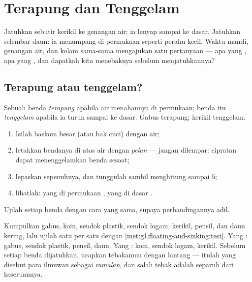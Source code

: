 \chapter{Terapung dan Tenggelam}\label{ch:g1:floating-and-sinking}

Jatuhkan sebutir kerikil ke genangan air: ia lenyap sampai ke dasar.
Jatuhkan selembar daun: ia menumpang di permukaan seperti perahu
kecil. Waktu mandi, genangan air, dan kolam sama-sama mengajukan satu
pertanyaan --- apa yang , apa yang , dan dapatkah
kita menebaknya sebelum menjatuhkannya?

\section{Terapung atau tenggelam?}

\begin{definition}\label{def:g1:floating-and-sinking:words}
Sebuah benda \emph{terapung} apabila air menahannya di
permukaan; benda itu \emph{tenggelam} apabila ia
turun sampai ke dasar. Gabus terapung; kerikil tenggelam.
\end{definition}

\begin{method}\label{met:g1:floating-and-sinking:test}
\begin{enumerate}
  \item Isilah baskom besar (atau bak cuci) dengan air;
  \item letakkan bendanya di atas air dengan \emph{pelan} --- jangan
        dilempar: cipratan dapat menenggelamkan benda  sesaat;
  \item lepaskan sepenuhnya, dan tunggulah sambil menghitung sampai $5$;
  \item lihatlah: yang di permukaan , yang di dasar .
\end{enumerate}
Ujilah setiap benda dengan cara yang sama, supaya perbandingannya adil.
\end{method}

\begin{example}\label{ex:g1:floating-and-sinking:sorting}
Kumpulkan gabus, koin, sendok plastik, sendok logam,
kerikil, pensil, dan daun kering, lalu ujilah satu per satu dengan
\cref{met:g1:floating-and-sinking:test}. Yang : gabus, sendok
plastik, pensil, daun. Yang : koin, sendok logam, kerikil.
Sebelum setiap benda dijatuhkan, ucapkan tebakanmu dengan lantang ---
itulah yang disebut para ilmuwan sebagai \emph{ramalan}, dan salah
tebak adalah separuh dari keseruannya.
\end{example}

